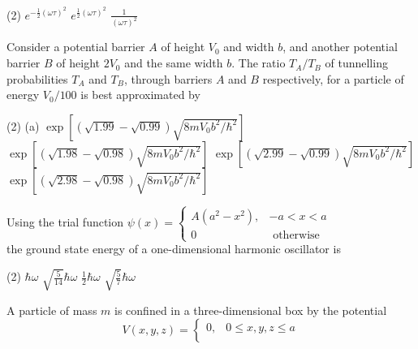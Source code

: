 \begin{enumerate}
\begin{minipage}{\textwidth}
\end{minipage}
\begin{tasks}(2)
	\task[\textbf{A.}] $e^{-\frac{1}{2}(\omega \tau)^{2}}$ 
	\task[\textbf{B.}] $e^{\frac{1}{2}(\omega \tau)^{2}}$
	\task[\textbf{D.}]$\frac{1}{(\omega \tau)^{2}}$
\end{tasks}
\begin{minipage}{\textwidth}
	\item Consider a potential barrier $A$ of height $V_{0}$ and width $b$, and another potential barrier $B$ of height $2 V_{0}$ and the same width $b$. The ratio $T_{A} / T_{B}$ of tunnelling probabilities $T_{A}$ and $T_{B}$, through barriers $A$ and $B$ respectively, for a particle of energy $V_{0} / 100$ is best approximated by
\end{minipage}
\begin{tasks}(2)
	\task[\textbf{A.}](a) $\exp \left[(\sqrt{1.99}-\sqrt{0.99}) \sqrt{8 m V_{0} b^{2} / \hbar^{2}}\right]$
	\task[\textbf{B.}]$\exp \left[(\sqrt{1.98}-\sqrt{0.98}) \sqrt{8 m V_{0} b^{2} / \hbar^{2}}\right]$
	\task[\textbf{C.}] $\exp \left[(\sqrt{2.99}-\sqrt{0.99}) \sqrt{8 m V_{0} b^{2} / \hbar^{2}}\right]$
	\task[\textbf{D.}]$\exp \left[(\sqrt{2.98}-\sqrt{0.98}) \sqrt{8 m V_{0} b^{2} / \hbar^{2}}\right]$
\end{tasks}
\begin{minipage}{\textwidth}
	\item  Using the trial function
	$\psi(x)=\left\{\begin{array}{cc}
	A\left(a^{2}-x^{2}\right), & -a<x<a \\
	0 & \text { otherwise }
	\end{array}\right.$\\
	the ground state energy of a one-dimensional harmonic oscillator is 
\end{minipage}
\begin{tasks}(2)
	\task[\textbf{A.}] $\hbar \omega$
	\task[\textbf{B.}] $\sqrt{\frac{5}{14}} \hbar \omega$
	\task[\textbf{C.}]$\frac{1}{2} \hbar \omega$
	\task[\textbf{D.}] $\sqrt{\frac{5}{7}} \hbar \omega$
\end{tasks}
\begin{minipage}{\textwidth}
	\item A particle of mass $m$ is confined in a three-dimensional box by the potential
	$$
	V(x, y, z)=\left\{\begin{array}{lc}
	0, & 0 \leq x, y, z \leq a \\

\end{array}$$
\end{minipage}
\end{enumerate}

